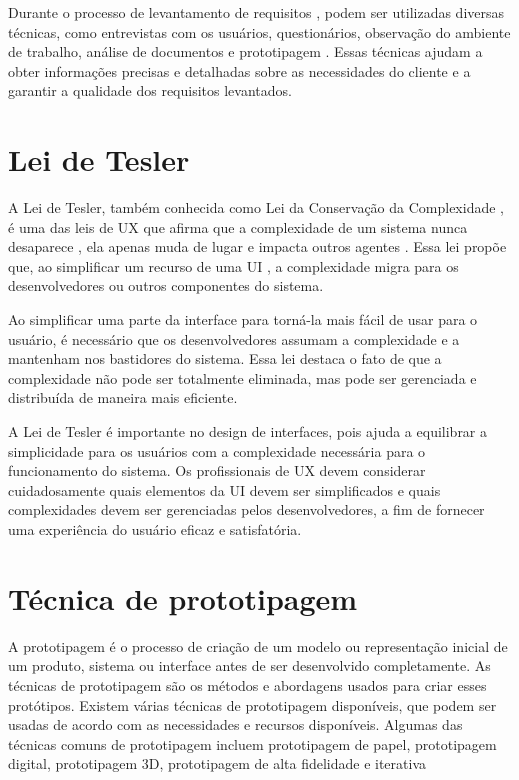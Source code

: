 Durante o processo de levantamento de requisitos , podem ser utilizadas diversas técnicas, como entrevistas com os usuários, questionários, observação do ambiente de trabalho, análise de documentos e prototipagem \cite{rogers2013design}. Essas técnicas ajudam a obter informações precisas e detalhadas sobre as necessidades do cliente e a garantir a qualidade dos requisitos levantados.

\section{Lei de Tesler }
A Lei de Tesler, também conhecida como Lei da Conservação da Complexidade , é uma das leis de \gls{UX} que afirma que a complexidade de um sistema nunca desaparece , ela apenas muda de lugar e impacta outros agentes \cite{yablonski2020leis}. Essa lei propõe que, ao simplificar um recurso de uma \gls{UI} , a complexidade migra para os desenvolvedores ou outros componentes do sistema.

Ao simplificar uma parte da interface para torná-la mais fácil de usar para o usuário, é necessário que os desenvolvedores assumam a complexidade e a mantenham nos bastidores do sistema. Essa lei destaca o fato de que a complexidade não pode ser totalmente eliminada, mas pode ser gerenciada e distribuída de maneira mais eficiente.

A Lei de Tesler é importante no design de interfaces, pois ajuda a equilibrar a simplicidade para os usuários com a complexidade necessária para o funcionamento do sistema. Os profissionais de \gls{UX} devem considerar cuidadosamente quais elementos da \gls{UI} devem ser simplificados e quais complexidades devem ser gerenciadas pelos desenvolvedores, a fim de fornecer uma experiência do usuário eficaz e satisfatória.

\section{Técnica de prototipagem}

A prototipagem é o processo de criação de um modelo ou representação inicial de um produto, sistema ou interface antes de ser desenvolvido completamente. As técnicas de prototipagem são os métodos e abordagens usados para criar esses protótipos. Existem várias técnicas de prototipagem disponíveis, que podem ser usadas de acordo com as necessidades e recursos disponíveis. Algumas das técnicas comuns de prototipagem incluem prototipagem de papel, prototipagem digital, prototipagem 3D, prototipagem de alta fidelidade e iterativa

